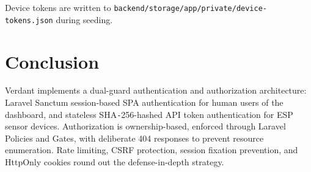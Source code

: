 \documentclass[11pt,a4paper]{article}
\begin{document}
Device tokens are written to \texttt{backend/storage/app/private/device-tokens.json} during seeding.

\section{Conclusion}

Verdant implements a dual-guard authentication and authorization architecture: Laravel Sanctum session-based SPA authentication for human users of the dashboard, and stateless SHA\texttt{-}256-hashed API token authentication for ESP sensor devices. Authorization is ownership-based, enforced through Laravel Policies and Gates, with deliberate 404 responses to prevent resource enumeration. Rate limiting, CSRF protection, session fixation prevention, and HttpOnly cookies round out the defense-in-depth strategy.
\end{document}
